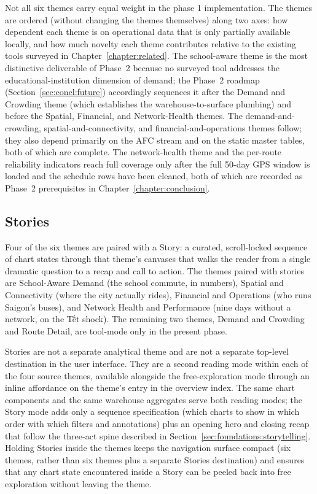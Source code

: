 Not all six themes carry equal weight in the phase 1 implementation. The
themes are ordered (without changing the themes themselves) along two
axes: how dependent each theme is on operational data that is only
partially available locally, and how much novelty each theme contributes
relative to the existing tools surveyed in
Chapter~\ref{chapter:related}. The school-aware theme is the most
distinctive deliverable of Phase~2 because no surveyed tool addresses
the educational-institution dimension of demand; the Phase~2 roadmap
(Section~\ref{sec:concl:future}) accordingly sequences it after the
Demand and Crowding theme (which establishes the warehouse-to-surface
plumbing) and before the Spatial, Financial, and Network-Health themes. The demand-and-crowding,
spatial-and-connectivity, and financial-and-operations themes follow;
they also depend primarily on the AFC stream and on the static master
tables, both of which are complete. The network-health theme and the
per-route reliability indicators reach full coverage only after the full
50-day GPS window is loaded and the schedule rows have been cleaned,
both of which are recorded as Phase~2 prerequisites in
Chapter~\ref{chapter:conclusion}.

\subsection{Stories}
\label{sec:solution:themes:stories}

Four of the six themes are paired with a Story: a curated, scroll-locked
sequence of chart states through that theme's canvases that walks the
reader from a single dramatic question to a recap and call to action. The
themes paired with stories are School-Aware Demand (the school commute, in
numbers), Spatial and Connectivity (where the city actually rides),
Financial and Operations (who runs Saigon's buses), and Network Health and
Performance (nine days without a network, on the Tết shock). The remaining
two themes, Demand and Crowding and Route Detail, are tool-mode only in the
present phase.

Stories are not a separate analytical theme and are not a separate
top-level destination in the user interface. They are a second reading
mode within each of the four source themes, available alongside the
free-exploration mode through an inline affordance on the theme's entry
in the overview index. The same chart components and the same warehouse aggregates serve
both reading modes; the Story mode adds only a sequence specification
(which charts to show in which order with which filters and annotations)
plus an opening hero and closing recap that follow the three-act spine
described in Section~\ref{sec:foundations:storytelling}. Holding Stories
inside the themes keeps the navigation surface compact (six themes, rather
than six themes plus a separate Stories destination) and ensures that any
chart state encountered inside a Story can be peeled back into free
exploration without leaving the theme.

